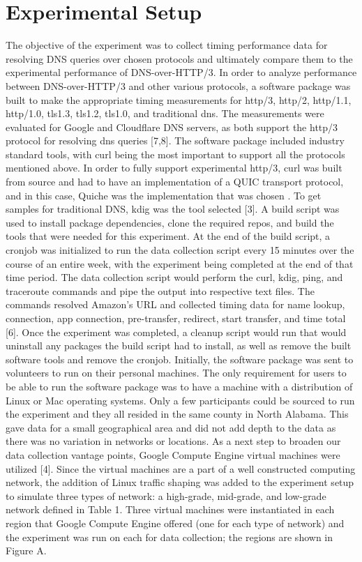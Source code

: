 \section{Experimental Setup}
The objective of the experiment was to collect timing performance data for resolving DNS queries over chosen protocols and ultimately compare them to the experimental performance of DNS-over-HTTP/3.  In order to analyze performance between DNS-over-HTTP/3 and other various protocols, a software package was built to make the appropriate timing measurements for http/3, http/2, http/1.1, http/1.0, tls1.3, tls1.2, tls1.0, and traditional dns. The measurements were evaluated for Google and Cloudflare DNS servers, as both support the http/3 protocol for resolving dns queries [7,8].  The software package included industry standard tools, with curl being the most important to support all the protocols mentioned above. In order to fully support experimental http/3, curl was built from source and had to have an implementation of a QUIC transport protocol, and in this case, Quiche was the implementation that was chosen \cite{curl,quiche}.  To get samples for traditional DNS, kdig was the tool selected [3].  A build script was used to install package dependencies, clone the required repos, and build the tools that were needed for this experiment. At the end of the build script, a cronjob was initialized to run the data collection script every 15 minutes over the course of an entire week, with the experiment being completed at the end of that time period.  The data collection script would perform the curl, kdig, ping, and traceroute commands and pipe the output into respective text files. The commands resolved Amazon’s URL and collected timing data for name lookup, connection, app connection, pre-transfer, redirect, start transfer, and time total [6].  Once the experiment was completed, a cleanup script would run that would uninstall any packages the build script had to install, as well as remove the built software tools and remove the cronjob. 
Initially, the software package was sent to volunteers to run on their personal machines. The only requirement for users to be able to run the software package was to have a machine with a distribution of Linux or Mac operating systems. Only a few participants could be sourced to run the experiment and they all resided in the same county in North Alabama. This gave data for a small geographical area and did not add depth to the data as there was no variation in networks or locations. As a next step to broaden our data collection vantage points, Google Compute Engine virtual machines were utilized [4].  Since the virtual machines are a part of a well constructed computing network, the addition of Linux traffic shaping was added to the experiment setup to simulate three types of network: a high-grade, mid-grade, and low-grade network defined in Table 1.  Three virtual machines were instantiated in each region that Google Compute Engine offered (one for each type of network) and the experiment was run on each for data collection; the regions are shown in Figure A.

